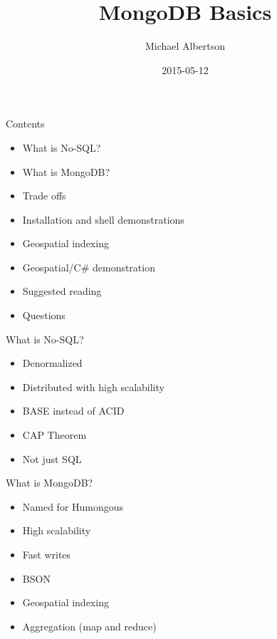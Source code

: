 \documentclass{beamer}
\title{MongoDB Basics}
\author{Michael Albertson}
\date{2015-05-12}
\begin{document}
\begin{frame}

\maketitle

\end{frame}


\begin{frame}{Contents}

\begin{itemize}
\item What is No-SQL?
\item What is MongoDB?
\item Trade offs
\item Installation and shell demonstrations
\item Geospatial indexing
\item Geospatial/C\# demonstration
\item Suggested reading
\item Questions
\end{itemize}

\end{frame}


\begin{frame}{What is No-SQL?}

\begin{itemize}
\item Denormalized
\item Distributed with high scalability
\item BASE instead of ACID %
\item CAP Theorem
\item Not just SQL
\end{itemize}

\end{frame}


\begin{frame}{What is MongoDB?}

\begin{itemize}
\item Named for Humongous
\item High scalability
\item Fast writes
\item BSON
\item Geospatial indexing
\item Aggregation (map and reduce)
\end{itemize}

\end{frame}
\end{document}
